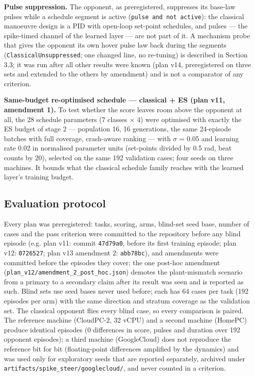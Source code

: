 \documentclass[10pt,a4paper]{article}
\begin{document}
\textbf{Pulse suppression.} The opponent, as preregistered, suppresses its base-law pulses while a schedule segment is active (\texttt{pulse and not active}): the classical manoeuvre design is a PID with open-loop set-point schedules, and pulses --- the spike-timed channel of the learned layer --- are not part of it. A mechanism probe that gives the opponent its own hover pulse law back during the segments (\texttt{ClassicalUnsuppressed}; one changed line, no re-tuning) is described in Section 3.3; it was run after all other results were known (plan v14, preregistered on three sets and extended to the others by amendment) and is not a comparator of any criterion.

\textbf{Same-budget re-optimised schedule --- classical + ES (plan v11, amendment 1).} To test whether the score leaves room above the opponent at all, the 28 schedule parameters (7 classes $\times$ 4) were optimised with exactly the ES budget of stage 2 --- population 16, 16 generations, the same 24-episode batches with full coverage, crash-aware ranking --- with $\sigma$ = 0.05 and learning rate 0.02 in normalised parameter units (set-points divided by 0.5 rad, beat counts by 20), selected on the same 192 validation cases; four seeds on three machines. It bounds what the classical schedule family reaches with the learned layer's training budget.

\subsection{Evaluation protocol}

Every plan was preregistered: tasks, scoring, arms, blind-set seed base, number of cases and the pass criterion were committed to the repository before any blind episode (e.g. plan v11: commit \texttt{47d79a0}, before its first training episode; plan v12: \texttt{0726527}; plan v13 amendment 2: \texttt{abb78bc}), and amendments were committed before the episodes they cover; the one post-hoc amendment (\texttt{plan\_v12/amendment\_2\_post\_hoc.json}) demotes the plant-mismatch scenario from a primary to a secondary claim after its result was seen and is reported as such. Blind sets use seed bases never used before; each has 64 cases per task (192 episodes per arm) with the same direction and stratum coverage as the validation set. The classical opponent flies every blind case, so every comparison is paired. The reference machine (CloudPC-2, 32 vCPU) and a second machine (HomePC) produce identical episodes (0 differences in score, pulses and duration over 192 opponent episodes); a third machine (GoogleCloud) does not reproduce the reference bit for bit (floating-point differences amplified by the dynamics) and was used only for exploratory seeds that are reported separately, archived under \texttt{artifacts/spike\_steer/googlecloud/}, and never counted in a criterion.
\end{document}
